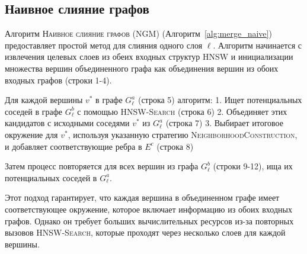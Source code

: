 \documentclass{article}
\begin{document}
\subsection{Наивное слияние графов}
Алгоритм \textsc{Наивное слияние графов} (\textsc{NGM}) (Алгоритм~\ref{alg:merge_naive}) предоставляет простой метод для слияния одного слоя $\ell$. Алгоритм начинается с извлечения целевых слоев из обеих входных структур HNSW и инициализации множества вершин объединенного графа как объединения вершин из обоих входных графов (строки 1-4).

Для каждой вершины $v^*$ в графе $G^a_\ell$ (строка 5) алгоритм:
1. Ищет потенциальных соседей в графе $G^b_\ell$ с помощью \textsc{HNSW-Search} (строка 6)
2. Объединяет этих кандидатов с исходными соседями $v^*$ из $G^a_\ell$ (строка 7)
3. Выбирает итоговое окружение для $v^*$, используя указанную стратегию \textsc{NeighborhoodConstruction}, и добавляет соответствующие ребра в $E^c$ (строка 8)

Затем процесс повторяется для всех вершин из графа $G^b_\ell$ (строки 9-12), ища их потенциальных соседей в $G^a_\ell$.

Этот подход гарантирует, что каждая вершина в объединенном графе имеет соответствующее окружение, которое включает информацию из обоих входных графов. Однако он требует больших вычислительных ресурсов из-за повторных вызовов \textsc{HNSW-Search}, которые проходят через несколько слоев для каждой вершины.
\end{document}
